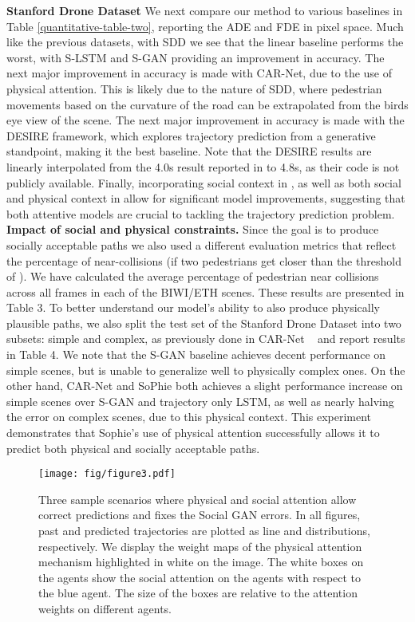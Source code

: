 \documentclass[10pt,twocolumn,letterpaper]{article}
\begin{document}
\textbf{Stanford Drone Dataset} We next compare our method to various baselines in Table \ref{quantitative-table-two}, reporting the ADE and FDE in pixel space. Much like the previous datasets, with SDD we see that the linear baseline performs the worst, with S-LSTM and S-GAN providing an improvement in accuracy. The next major improvement in accuracy is made with CAR-Net, due to the use of physical attention. This is likely due to the nature of SDD, where pedestrian movements based on the curvature of the road can be extrapolated from the birds eye view of the scene. The next major improvement in accuracy is made with the DESIRE framework, which explores trajectory prediction from a generative standpoint, making it the best baseline. Note that the DESIRE results are linearly interpolated from the 4.0s result reported in \cite{lee2017desire} to 4.8s, as their code is not publicly available. Finally, incorporating social context in , as well as both social and physical context in  allow for significant model improvements, suggesting that both attentive models are crucial to tackling the trajectory prediction problem.\\

\textbf{Impact of social and physical constraints.} Since the goal is to produce socially acceptable paths we also used a different evaluation metrics that reflect the percentage of near-collisions (if two pedestrians get closer than the threshold of ). We have calculated the average percentage of pedestrian near collisions across all frames in each of the BIWI/ETH scenes. These results are presented in Table 3. To better understand our model's ability to also produce physically plausible paths, we also split the test set of the Stanford Drone Dataset into two subsets: simple and complex, as previously done in CAR-Net ~\cite{sadeghian2017car} and report results in Table 4. We note that the S-GAN baseline achieves decent performance on simple scenes, but is unable to generalize well to physically complex ones. On the other hand, CAR-Net and SoPhie both achieves a slight performance increase on simple scenes over S-GAN and trajectory only LSTM, as well as nearly halving the error on complex scenes, due to this physical context. This experiment demonstrates that Sophie's use of physical attention successfully allows it to predict both physical and socially acceptable paths.


\begin{figure*}[ht!]
  \centering
    \texttt{[image: fig/figure3.pdf]}
\caption{\small Three sample scenarios where physical and social attention allow correct predictions and fixes the Social GAN errors. In all figures, past and predicted trajectories are plotted as line and distributions, respectively. We display the weight maps of the physical attention mechanism highlighted in white on the image. The white boxes on the agents show the social attention on the agents with respect to the blue agent. The size of the boxes are relative to the attention weights on different agents.
} 
	\label{fig:qual1}
\end{figure*}
\end{document}
